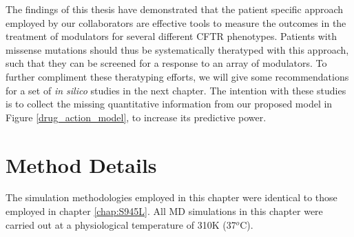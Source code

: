 The findings of this thesis have demonstrated that the patient specific approach employed by our collaborators are effective tools to measure the outcomes in the treatment of modulators for several different CFTR phenotypes. Patients with missense mutations should thus be systematically theratyped with this approach, such that they can be screened for a response to an array of modulators. To further compliment these theratyping efforts, we will give some recommendations for a set of \textit{in silico} studies in the next chapter. The intention with these studies is to collect the missing quantitative information from our proposed model in Figure \ref{drug_action_model}, to increase its predictive power. 



\section{Method Details}
The simulation methodologies employed in this chapter were identical to those employed in chapter \ref{chap:S945L}. All MD simulations in this chapter were carried out at a physiological temperature of 310K (37$^o$C).
